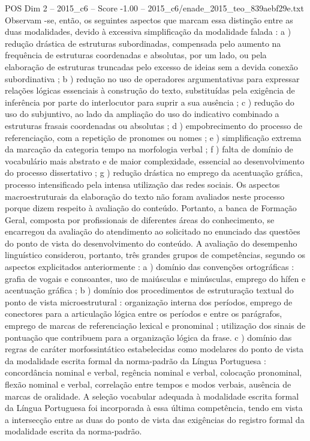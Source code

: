 \begin{textsample}{POS Dim 2 – 2015\_c6 – Score -1.00 – 2015\_c6/enade\_2015\_teo\_839aebf29e.txt}
Observam -se, então, os seguintes aspectos que marcam essa distinção entre as duas modalidades, devido à excessiva simplificação da modalidade falada : a ) redução drástica de estruturas subordinadas, compensada pelo aumento na frequência de estruturas coordenadas e absolutas, por um lado, ou pela elaboração de estruturas truncadas pelo excesso de ideias sem a devida conexão subordinativa ; b ) redução no uso de operadores argumentativas para expressar relações lógicas essenciais à construção do texto, substituídas pela exigência de inferência por parte do interlocutor para suprir a sua ausência ; c ) redução do uso do subjuntivo, ao lado da ampliação do uso do indicativo combinado a estruturas frasais coordenadas ou absolutas ; d ) empobrecimento do processo de referenciação, com a repetição de pronomes ou nomes ; e ) simplificação extrema da marcação da categoria tempo na morfologia verbal ; f ) falta de domínio de vocabulário mais abstrato e de maior complexidade, essencial ao desenvolvimento do processo dissertativo ; g ) redução drástica no emprego da acentuação gráfica, processo intensificado pela intensa utilização das redes sociais.
Os aspectos macroestruturais da elaboração do texto não foram avaliados neste processo porque dizem respeito à avaliação do conteúdo.
Portanto, a banca de Formação Geral, composta por profissionais de diferentes áreas do conhecimento, se encarregou da avaliação do atendimento ao solicitado no enunciado das questões do ponto de vista do desenvolvimento do conteúdo.
A avaliação do desempenho linguístico considerou, portanto, três grandes grupos de competências, segundo os aspectos explicitados anteriormente : a ) domínio das convenções ortográficas : grafia de vogais e consoantes, uso de maiúsculas e minúsculas, emprego do hífen e acentuação gráfica ; b ) domínio dos procedimentos de estruturação textual do ponto de vista microestrutural : organização interna dos períodos, emprego de conectores para a articulação lógica entre os períodos e entre os parágrafos, emprego de marcas de referenciação lexical e pronominal ; utilização dos sinais de pontuação que contribuem para a organização lógica da frase. c ) domínio das regras de caráter morfossintático estabelecidas como modelares do ponto de vista da modalidade escrita formal da norma-padrão da Língua Portuguesa : concordância nominal e verbal, regência nominal e verbal, colocação pronominal, flexão nominal e verbal, correlação entre tempos e modos verbais, ausência de marcas de oralidade.
A seleção vocabular adequada à modalidade escrita formal da Língua Portuguesa foi incorporada à essa última competência, tendo em vista a intersecção entre as duas do ponto de vista das exigências do registro formal da modalidade escrita da norma-padrão.

\end{textsample}
